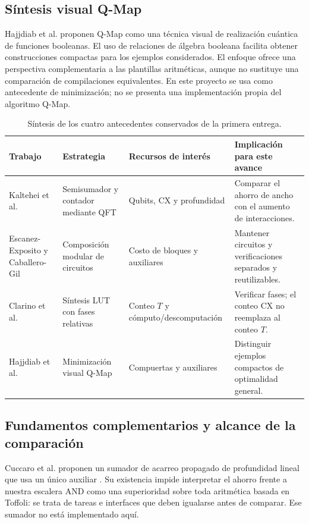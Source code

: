 \documentclass[10pt,a4paper,twocolumn]{article}
\begin{document}
\subsection{Síntesis visual Q-Map}
Hajjdiab et al. \cite{hajjdiab2024} proponen Q-Map como una técnica visual
de realización cuántica de funciones booleanas. El uso de relaciones de
álgebra booleana facilita obtener construcciones compactas para los ejemplos
considerados. El enfoque ofrece una perspectiva complementaria a las
plantillas aritméticas, aunque no sustituye una comparación de compilaciones
equivalentes. En este proyecto se usa como antecedente de minimización;
no se presenta una implementación propia del algoritmo Q-Map.

\begin{table}[t]
\centering\small
\caption{Síntesis de los cuatro antecedentes conservados de la primera entrega.}
\label{tab:literatura}
\renewcommand{\arraystretch}{1.12}
\begin{tabular}{@{}>{\raggedright\arraybackslash}p{2.5cm}>{\raggedright\arraybackslash}p{4.1cm}>{\raggedright\arraybackslash}p{4.1cm}>{\raggedright\arraybackslash}p{5cm}@{}}
\toprule
Trabajo & Estrategia & Recursos de interés & Implicación para este avance\\
\midrule
Kaltehei et al. \cite{kaltehei2026} & Semisumador y contador mediante QFT & Qubits, CX y profundidad & Comparar el ahorro de ancho con el aumento de interacciones.\\
Escanez-Exposito y Caballero-Gil \cite{escanez2026} & Composición modular de circuitos & Costo de bloques y auxiliares & Mantener circuitos y verificaciones separados y reutilizables.\\
Clarino et al. \cite{clarino2025} & Síntesis LUT con fases relativas & Conteo $T$ y cómputo/descomputación & Verificar fases; el conteo CX no reemplaza al conteo $T$.\\
Hajjdiab et al. \cite{hajjdiab2024} & Minimización visual Q-Map & Compuertas y auxiliares & Distinguir ejemplos compactos de optimalidad general.\\
\bottomrule
\end{tabular}
\end{table}

\subsection{Fundamentos complementarios y alcance de la comparación}
Cuccaro et al. proponen un sumador de acarreo propagado de profundidad
lineal que usa un único auxiliar \cite{cuccaro2004}. Su existencia impide
interpretar el ahorro frente a nuestra escalera AND como una superioridad
sobre toda aritmética basada en Toffoli: se trata de tareas e interfaces
que deben igualarse antes de comparar. Ese sumador no está implementado aquí.
\end{document}

